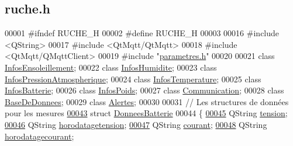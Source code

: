 \hypertarget{ruche_8h_source}{}\subsection{ruche.\+h}
\label{ruche_8h_source}

\begin{DoxyCode}
00001 \textcolor{preprocessor}{#ifndef RUCHE\_H}
00002 \textcolor{preprocessor}{#define RUCHE\_H}
00003 
00016 \textcolor{preprocessor}{#include <QString>}
00017 \textcolor{preprocessor}{#include <QtMqtt/QtMqtt>}
00018 \textcolor{preprocessor}{#include <QtMqtt/QMqttClient>}
00019 \textcolor{preprocessor}{#include "\hyperlink{parametres_8h}{parametres.h}"}
00020 
00021 \textcolor{keyword}{class }\hyperlink{class_infos_ensoleillement}{InfosEnsoleillement};
00022 \textcolor{keyword}{class }\hyperlink{class_infos_humidite}{InfosHumidite};
00023 \textcolor{keyword}{class }\hyperlink{class_infos_pression_atmospherique}{InfosPressionAtmospherique};
00024 \textcolor{keyword}{class }\hyperlink{class_infos_temperature}{InfosTemperature};
00025 \textcolor{keyword}{class }\hyperlink{class_infos_batterie}{InfosBatterie};
00026 \textcolor{keyword}{class }\hyperlink{class_infos_poids}{InfosPoids};
00027 \textcolor{keyword}{class }\hyperlink{class_communication}{Communication};
00028 \textcolor{keyword}{class }\hyperlink{class_base_de_donnees}{BaseDeDonnees};
00029 \textcolor{keyword}{class }\hyperlink{class_alertes}{Alertes};
00030 
00031 \textcolor{comment}{// Les structures de données pour les mesures}
\hyperlink{struct_donnees_batterie}{00043} \textcolor{comment}{}\textcolor{keyword}{struct }\hyperlink{struct_donnees_batterie}{DonneesBatterie}
00044 \{
\hyperlink{struct_donnees_batterie_a1394510ba159a846820452e9e333f38b}{00045}     QString \hyperlink{struct_donnees_batterie_a1394510ba159a846820452e9e333f38b}{tension};
\hyperlink{struct_donnees_batterie_ac19dd5bb96d677e228ddd22159076d26}{00046}     QString \hyperlink{struct_donnees_batterie_ac19dd5bb96d677e228ddd22159076d26}{horodatagetension};
\hyperlink{struct_donnees_batterie_a7a996ea5eacd6839a8a34dbbe48eb59a}{00047}     QString \hyperlink{struct_donnees_batterie_a7a996ea5eacd6839a8a34dbbe48eb59a}{courant};
\hyperlink{struct_donnees_batterie_a1318c296d4e6926304851a7cef0ad957}{00048}     QString \hyperlink{struct_donnees_batterie_a1318c296d4e6926304851a7cef0ad957}{horodatagecourant};

\end{DoxyCode}
